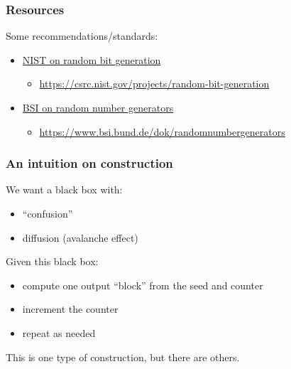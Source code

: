 \begin{frame}
  \frametitle{Resources}

  Some recommendations/standards:
  \begin{itemize}
    \item \href{https://csrc.nist.gov/projects/random-bit-generation}{NIST on random bit generation}
    \begin{itemize}
      \item \url{https://csrc.nist.gov/projects/random-bit-generation}
    \end{itemize}
    \item \href{https://www.bsi.bund.de/dok/randomnumbergenerators}{BSI on random number generators}
    \begin{itemize}
      \item \url{https://www.bsi.bund.de/dok/randomnumbergenerators}
    \end{itemize}
  \end{itemize}
\end{frame}

\begin{frame}
  \frametitle{An intuition on construction}

  We want a black box with:
  \begin{itemize}[<+(1)->]
    \item \enquote{confusion}
    \item diffusion (avalanche effect)
  \end{itemize}

  \pause
  Given this black box:
  \begin{itemize}[<+(1)->]
    \item compute one output \enquote{block} from the seed and counter
    \item increment the counter
    \item repeat as needed
  \end{itemize}

  \pause
  This is one type of construction, but there are others.
\end{frame}

